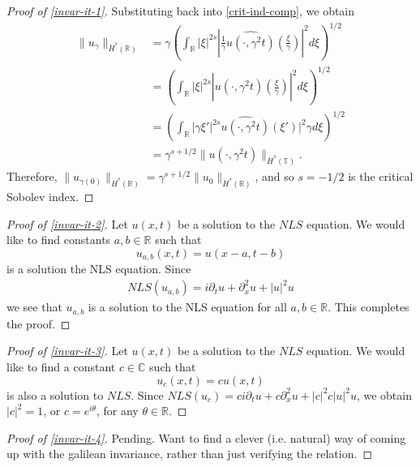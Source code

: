 \documentclass[12pt,reqno]{amsart}
\numberwithin{equation}{section}  %
\numberwithin{figure}{section}
\newcommand{\rr}{\mathbb{R}}
\newcommand{\cc}{\mathbb{C}}
\newcommand{\ci}{\mathbb{T}}
\newcommand{\wh}{\widehat}
\newcommand{\p}{\partial}
\theoremstyle{plain}
\theoremstyle{definition}
\theoremstyle{remark}
\begin{document}
\begin{appendices}
\begin{proof}[Proof of \eqref{invar-it-1}]
Substituting back into \eqref{crit-ind-comp}, we obtain
%
%
\begin{equation*}
\begin{split}
  \| u_{\gamma} \|_{\dot{H}^s(\rr)} 
  & = \gamma\left( \int_{\rr} | \xi |^{2s} |
  \frac{1}{\gamma}\wh{u(\cdot, \gamma^{2}t)}(\frac{\xi}{\gamma}) |^2 d \xi
  \right)^{1/2}
  \\
  & = \left( \int_{\rr}| \xi |^{2s} | \wh{u(\cdot,
  \gamma^{2}t)}(\frac{\xi}{\gamma}) |^2 d \xi  \right)^{1/2}
  \\
  & = \left( \int_{\rr} | \gamma \xi' |^{2s} 
  \wh{u(\cdot, \gamma^{2}t)}(\xi') |^2 \gamma d \xi
  \right)^{1/2}
  \\
  & = \gamma^{s + 1/2} \|u(\cdot, \gamma^{2}t) \|_{\dot{H}^s (\ci)}.
\end{split}
\end{equation*}
%
%
Therefore, $\| u_{\gamma(0)} \|_{\dot{H}^s(\rr)} = \gamma^{s + 1/2} \|
u_{0} \|_{\dot{H}^{s}(\rr)}$, and so $s=-1/2$ is the critical Sobolev index.
\end{proof}
%
%
\begin{proof}[Proof of \eqref{invar-it-2}] Let $u(x, t)$ be a solution to the $NLS$ equation.
We would like to find constants
$a, b \in \rr$ such that $$u_{a,b}(x,t) = u(x -a, t - b)$$ is a solution the NLS
equation. Since
%
%
\begin{equation*}
\begin{split}
  NLS(u_{a,b}) = i \p_t u + \p_x^{2} u  + | u |^{2} u 
\end{split}
\end{equation*}
%
%
we see that $u_{a,b}$ is a solution to the NLS equation for all $a, b \in \rr$.
This completes the proof.
\end{proof}
%
%
\begin{proof}[Proof of \eqref{invar-it-3}]
Let $u(x, t)$ be a solution to the $NLS$ equation.
We would like to find a constant
$c \in \cc$ such that
\[
u_c (x, t) = c u(x, t)
\]
is also a solution to $NLS$.  Since 
$NLS(u_{c}) = c i \p_{t} u  + c \p_{x}^{2} u + |c|^2c | u |^{2}u$, we obtain
$|c|^{2} = 1$, or $c = e^{i \theta}$, for any $\theta \in \rr$.
\end{proof}
%
%
\begin{proof}[Proof of \eqref{invar-it-4}]
Pending. Want to find a clever (i.e. natural)
way of coming up with the galilean invariance, rather than just verifying the relation.
\end{proof}
%
%
%
\end{appendices}


\end{document}
